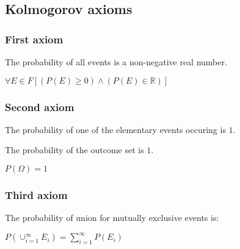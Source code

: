 
\subsection{Kolmogorov axioms}

\subsubsection{First axiom}

The probability of all events is a non-negative real number.

$\forall E \in F [(P(E)\ge 0)\land (P(E)\in \mathbb{R})]$

\subsubsection{Second axiom}

The probability of one of the elementary events occuring is \(1\).

The probability of the outcome set is \(1\).

$P(\Omega )=1$

\subsubsection{Third axiom}

The probability of union for mutually exclusive events is:

$P(\cup^\infty_{i=1}E_i)=\sum_{i=1}^\infty P(E_i)$

